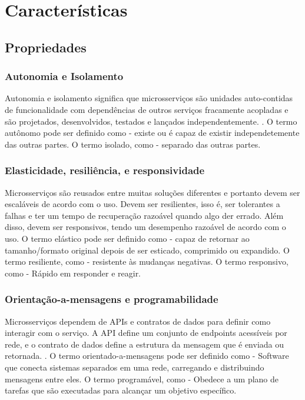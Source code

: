 \chapter{Características}\label{chapter-caracteristicas}

\section{Propriedades}

\subsection{Autonomia e Isolamento}
Autonomia e isolamento significa que microsserviços são unidades auto-contidas de funcionalidade com dependências de outros serviços fracamente acopladas e são projetados, desenvolvidos, testados e lançados independentemente. \cite{Familiar2015}. O termo autônomo pode ser definido como - existe ou é capaz de existir independetemente das outras partes. O termo isolado, como - separado das outras partes.

\subsection{Elasticidade, resiliência, e responsividade}

Microsserviços são reusados entre muitas soluções diferentes e portanto devem ser escaláveis de acordo com o uso. Devem ser resilientes, isso é, ser tolerantes a falhas e ter um tempo de recuperação razoável quando algo der errado. Além disso, devem ser responsivos, tendo um desempenho razoável de acordo com o uso. \cite{Familiar2015} O termo elástico pode ser definido como - capaz de retornar ao tamanho/formato original depois de ser esticado, comprimido ou expandido. O termo resiliente, como - resistente às mudanças negativas. O termo responsivo, como - Rápido em responder e reagir.

\subsection{Orientação-a-mensagens e programabilidade}

Microsserviços dependem de APIs e contratos de dados para definir como interagir com o serviço. A API define um conjunto de endpoints acessíveis por rede, e o contrato de dados define a estrutura da mensagem que é enviada ou retornada. \cite{Familiar2015}. O termo orientado-a-mensagens pode ser definido como - Software que conecta sistemas separados em uma rede, carregando e distribuindo mensagens entre eles. O termo programável, como - Obedece a um plano de tarefas que são executadas para alcançar um objetivo específico.

